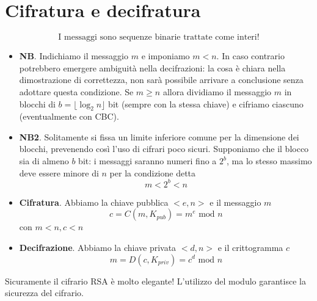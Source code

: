 \section{Cifratura e decifratura}
\[\boxed{\text{I messaggi sono sequenze binarie trattate come interi!}}\]
\begin{itemize}
	\item  \textbf{NB}. Indichiamo il messaggio $m$ e imponiamo $m<n$. In caso contrario potrebbero emergere ambiguità nella decifrazioni: la cosa è chiara nella dimostrazione di correttezza, non sarà possibile arrivare a conclusione senza adottare questa condizione. Se $m \geq n$ allora dividiamo il messaggio $m$ in blocchi di $b = \lfloor \log_2n \rfloor$ bit (sempre con la stessa chiave) e cifriamo ciascuno (eventualmente con CBC).
	\item \textbf{NB2}. Solitamente si fissa un limite inferiore comune per la dimensione dei blocchi, prevenendo così l'uso di cifrari poco sicuri. Supponiamo che il blocco sia di almeno $b$ bit: i messaggi saranno numeri fino a $2^b$, ma lo stesso massimo deve essere minore di $n$ per la condizione detta $$m < 2^b < n$$ 
	\item \textbf{Cifratura}. Abbiamo la chiave pubblica $<e,n>$ e il messaggio $m$
	$$ c = C(m, K_{pub}) = m^{e} \text{ mod } n$$
	con $m<n, c <n$
	\item \textbf{Decifrazione}. Abbiamo la chiave privata $<d,n>$ e il crittogramma $c$
	$$ m = D(c, K_{priv}) = c^{d} \text{ mod } n$$
\end{itemize} 
Sicuramente il cifrario RSA è molto elegante! L'utilizzo del modulo garantisce la sicurezza del cifrario. 

